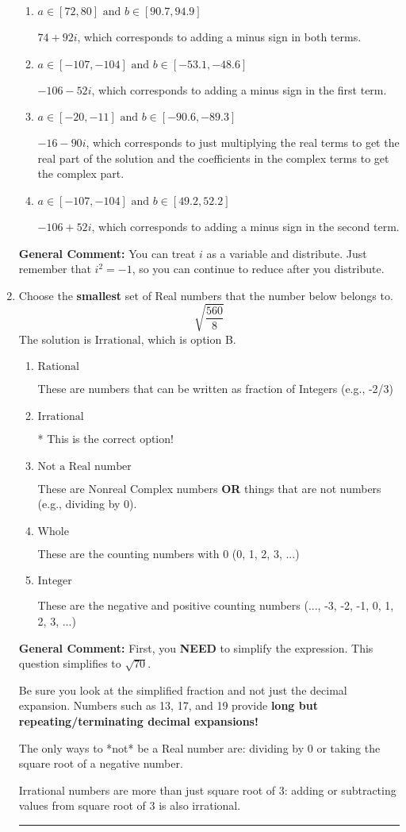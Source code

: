 \documentclass{extbook}[14pt]
\newcommand{\litem}[1]{\item #1

\rule{\textwidth}{0.4pt}}
\begin{document}
\begin{enumerate}
{\begin{enumerate}[label=\Alph*.]
* $74 - 92 i$, which is the correct option.
\item \( a \in [72, 80] \text{ and } b \in [90.7, 94.9] \)

 $74 + 92 i$, which corresponds to adding a minus sign in both terms.
\item \( a \in [-107, -104] \text{ and } b \in [-53.1, -48.6] \)

 $-106 - 52 i$, which corresponds to adding a minus sign in the first term.
\item \( a \in [-20, -11] \text{ and } b \in [-90.6, -89.3] \)

 $-16 - 90 i$, which corresponds to just multiplying the real terms to get the real part of the solution and the coefficients in the complex terms to get the complex part.
\item \( a \in [-107, -104] \text{ and } b \in [49.2, 52.2] \)

 $-106 + 52 i$, which corresponds to adding a minus sign in the second term.
\end{enumerate}

\textbf{General Comment:} You can treat $i$ as a variable and distribute. Just remember that $i^2=-1$, so you can continue to reduce after you distribute.
}
\litem{
Choose the \textbf{smallest} set of Real numbers that the number below belongs to.
\[ \sqrt{\frac{560}{8}} \]The solution is \( \text{Irrational} \), which is option B.\begin{enumerate}[label=\Alph*.]
\item \( \text{Rational} \)

These are numbers that can be written as fraction of Integers (e.g., -2/3)
\item \( \text{Irrational} \)

* This is the correct option!
\item \( \text{Not a Real number} \)

These are Nonreal Complex numbers \textbf{OR} things that are not numbers (e.g., dividing by 0).
\item \( \text{Whole} \)

These are the counting numbers with 0 (0, 1, 2, 3, ...)
\item \( \text{Integer} \)

These are the negative and positive counting numbers (..., -3, -2, -1, 0, 1, 2, 3, ...)
\end{enumerate}

\textbf{General Comment:} First, you \textbf{NEED} to simplify the expression. This question simplifies to $\sqrt{70}$. 
 
 Be sure you look at the simplified fraction and not just the decimal expansion. Numbers such as 13, 17, and 19 provide \textbf{long but repeating/terminating decimal expansions!} 
 
 The only ways to *not* be a Real number are: dividing by 0 or taking the square root of a negative number. 
 
 Irrational numbers are more than just square root of 3: adding or subtracting values from square root of 3 is also irrational.
}
\end{enumerate}
\end{document}

